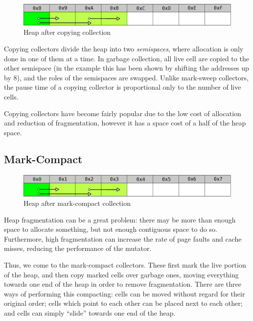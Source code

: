 \begin{figure}[h]
  \centering
  \includegraphics[width=\textwidth]{lit-gc-copying}
  \caption{Heap after copying collection}
  \label{fig:lit-gc-copying}
\end{figure}

Copying collectors divide the heap into two \textit{semispaces}, where
allocation is only done in one of them at a time. In garbage
collection, all live cell are copied to the other semispace (in the
example this has been shown by shifting the addresses up by 8), and
the roles of the semispaces are swapped\cite{Fenichel69}. Unlike
mark-sweep collectors, the pause time of a copying collector is
proportional only to the number of live cells\cite{Appel87}.

Copying collectors have become fairly popular due to the low cost of
allocation and reduction of fragmentation, however it has a space cost
of a half of the heap space\cite{GarbageCollection}.

\subsection{Mark-Compact}
\label{sec:lit-gc-markcompact}

\begin{figure}[h]
  \centering
  \includegraphics[width=\textwidth]{lit-gc-markcompact}
  \caption{Heap after mark-compact collection}
  \label{fig:lit-gc-markcompact}
\end{figure}

Heap fragmentation can be a great problem: there may be more than
enough space to allocate something, but not enough contiguous space to
do so. Furthermore, high fragmentation can increase the rate of page
faults and cache misses, reducing the performance of the
mutator\cite{Zorn90}.

Thus, we come to the mark-compact collectors. These first mark the
live portion of the heap, and then copy marked cells over garbage
ones, moving everything towards one end of the heap in order to remove
fragmentation\cite{GarbageCollection}. There are three ways of
performing this compacting: cells can be moved without regard for
their original order; cells which point to each other can be placed
next to each other; and cells can simply ``slide'' towards one end of
the heap\cite{Cohen81}.

